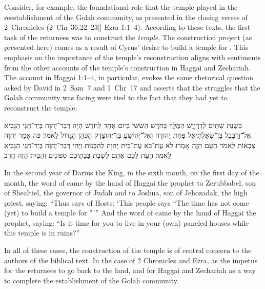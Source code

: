 Consider, for example, the foundational role that the temple played in the reestablishment of the Golah community, as presented in the closing verses of 2~Chronicles (2~Chr 36:22--23|| Ezra 1:1--4). According to these texts, the first task of the returnees was to construct the \emph{temple}. The construction project (as presented here) comes as a result of Cyrus' desire to build a temple for \yahweh. This emphasis on the importance of the temple's reconstruction aligns with sentiments from the other accounts of the temple's construction in Haggai and Zechariah. The account in Haggai 1:1--4, in particular, evokes the same rhetorical question asked by David in 2~Sam~7 and 1~Chr~17 and asserts that the struggles that the Golah community was facing were tied to the fact that they had yet to reconstruct the temple:
\begin{hebrewtext}
    ‏בִּשְׁנַת שְׁתַּיִם לְדָרְיָוֶשׁ הַמֶּלֶךְ בַּחֹדֶשׁ הַשִּׁשִּׁי בְּיוֹם אֶחָד לַחֹדֶשׁ הָיָה דְבַר־יְהוָה בְּיַד־חַגַּי הַנָּבִיא אֶל־זְרֻבָּבֶל בֶּן־שְׁאַלְתִּיאֵל פַּחַת יְהוּדָה וְאֶל־יְהוֹשֻׁעַ בֶּן־יְהוֹצָדָק הַכֹּהֵן הַגָּדוֹל לֵאמֹר׃ 
    כֹּה אָמַר יְהוָה צְבָאוֹת לֵאמֹר הָעָם הַזֶּה אָמְרוּ לֹא עֶת־בֹּא עֶת־בֵּית יְהוָה לְהִבָּנוֹת׃  
    וַיְהִי דְּבַר־יְהוָה בְּיַד־חַגַּי הַנָּבִיא לֵאמֹר׃ 
    הַעֵת לָכֶם אַתֶּם לָשֶׁבֶת בְּבָתֵּיכֶם סְפוּנִים וְהַבַּיִת הַזֶּה חָרֵב׃
\end{hebrewtext}
\begin{translation}
    In the second year of Darius the King, in the sixth month, on the first day of the month, the word of \yahweh came by the hand of Haggai the prophet to Zerubbabel, son of Shealtiel, the governor of Judah and to Joshua, son of Jehozadak, the high priest, saying: 
    ``Thus says \yahweh of Hosts: `This people says ``The time has not come (yet) to build a temple for \yahweh'''''
    And the word of \yahweh came by the hand of Haggai the prophet, saying:
    ``Is it time for you to live in your (own) paneled houses while this temple is in ruins?''
\end{translation}
\noindent
In all of these cases, the construction of the temple is of central concern to the authors of the biblical text. In the case of 2 Chronicles and Ezra, as the impetus for the returnees to go back to the land, and for Haggai and Zechariah as a way to complete the establishment of the Golah community.


